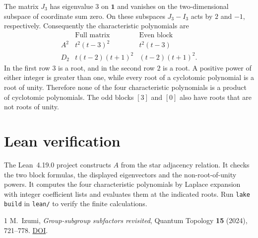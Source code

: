 \documentclass[11pt]{article}
\begin{document}
The matrix \(J_3\) has eigenvalue \(3\) on \(\mathbf 1\) and
vanishes on the two-dimensional subspace of coordinate sum zero.
On these subspaces \(J_3-I_3\) acts by \(2\) and \(-1\),
respectively. Consequently the characteristic polynomials are
\[
\begin{array}{c|cc}
 & \text{Full matrix} & \text{Even block}\\ \hline
A^2 & t^2(t-3)^2 & t^2(t-3)\\
D_2 & t(t-2)(t+1)^2 & (t-2)(t+1)^2 .
\end{array}
\]
In the first row \(3\) is a root, and in the second row \(2\)
is a root. A positive power of either integer is greater than
one, while every root of a cyclotomic polynomial is a root
of unity. Therefore none of the four characteristic polynomials
is a product of cyclotomic polynomials. The odd blocks
\([3]\) and \([0]\) also have roots that are not roots of unity.

\section*{Lean verification}

The Lean~4.19.0 project constructs \(A\) from the star adjacency
relation. It checks the two block formulas, the displayed
eigenvectors and the non-root-of-unity powers. It computes the
four characteristic polynomials by Laplace expansion with
integer coefficient lists and evaluates them at the indicated roots.
Run \verb|lake build| in \verb|lean/|
to verify the finite calculations.

\begin{thebibliography}{1}
M.~Izumi, \emph{Group-subgroup subfactors revisited},
Quantum Topology \textbf{15} (2024), 721--778.
\href{https://doi.org/10.4171/QT/211}{DOI}.
\end{thebibliography}
\end{document}
